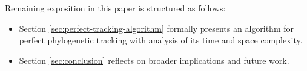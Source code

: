 Remaining exposition in this paper is structured as follows:
\begin{itemize}
\item Section \ref{sec:perfect-tracking-algorithm} formally presents an algorithm for perfect phylogenetic tracking with analysis of its time and space complexity.
\item Section \ref{sec:conclusion} reflects on broader implications and future work.
\end{itemize}
